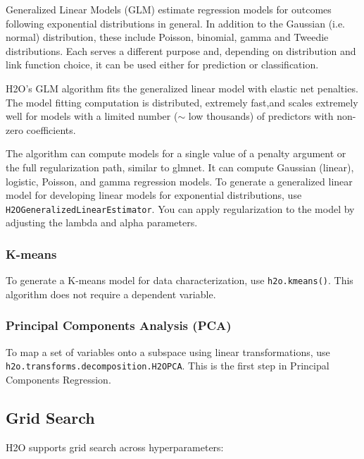 {Generalized Linear Models (GLM) estimate regression models for
outcomes following exponential distributions in general. In
addition to the Gaussian (i.e. normal) distribution, these include
Poisson, binomial, gamma and Tweedie distributions. Each serves
a different purpose and, depending on distribution and link
function choice, it can be used either for prediction or
classification.

H2O's GLM algorithm fits the generalized linear model with
elastic net penalties. The model fitting computation is distributed,
extremely fast,and scales extremely well for models with a limited
number ($\sim$ low thousands) of predictors with non-zero
coefficients. 

The algorithm can compute models for a single value of a penalty argument or the full regularization path, similar to glmnet. It can compute Gaussian (linear), logistic, Poisson, and gamma regression models.
To generate a generalized linear model for developing
linear models for exponential distributions, use
{\texttt{H2OGeneralizedLinearEstimator}}. You can apply
regularization to the model by adjusting the lambda and alpha
parameters.



\subsubsection{K-means}
To generate a K-means model for data characterization, use
{\texttt{h2o.kmeans()}}. This algorithm does not require a
dependent variable.



\subsubsection{Principal Components Analysis (PCA)}
To map a set of variables onto a subspace using linear
transformations, use {\texttt{h2o.transforms.decomposition.H2OPCA}}.
This is the first step in Principal Components Regression.



\subsection{Grid Search}
H2O supports grid search across hyperparameters:



}

